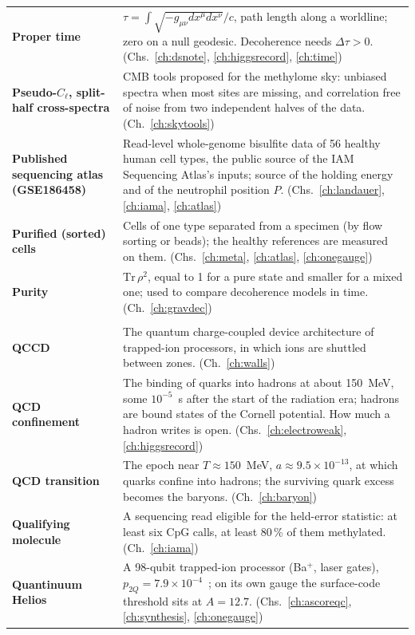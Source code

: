 {\begin{longtable}{@{}>{\raggedright\arraybackslash}p{}>{\raggedright\arraybackslash}p{}@{}}
\textbf{Proper time} & $\tau=\int\sqrt{-g_{\mu\nu}dx^\mu dx^\nu}/c$, path length along a worldline; zero on a null geodesic. Decoherence needs $\Delta\tau>0$. {\footnotesize(Chs.~\ref{ch:dsnote}, \ref{ch:higgsrecord}, \ref{ch:time})}\\[1pt]
\textbf{Pseudo-$C_\ell$, split-half cross-spectra} & CMB tools proposed for the methylome sky: unbiased spectra when most sites are missing, and correlation free of noise from two independent halves of the data. {\footnotesize(Ch.~\ref{ch:skytools})}\\[1pt]
\textbf{Published sequencing atlas (GSE186458)} & Read-level whole-genome bisulfite data of 56 healthy human cell types, the public source of the IAM Sequencing Atlas's inputs; source of the holding energy and of the neutrophil position $P$. {\footnotesize(Chs.~\ref{ch:landauer}, \ref{ch:iama}, \ref{ch:atlas})}\\[1pt]
\textbf{Purified (sorted) cells} & Cells of one type separated from a specimen (by flow sorting or beads); the healthy references are measured on them. {\footnotesize(Chs.~\ref{ch:meta}, \ref{ch:atlas}, \ref{ch:onegauge})}\\[1pt]
\textbf{Purity} & $\mathrm{Tr}\,\rho^2$, equal to 1 for a pure state and smaller for a mixed one; used to compare decoherence models in time. {\footnotesize(Ch.~\ref{ch:gravdec})}\\[1pt]
\multicolumn{2}{@{}l}{\normalsize\textbf{Q}}\\[2pt]
\textbf{QCCD} & The quantum charge-coupled device architecture of trapped-ion processors, in which ions are shuttled between zones. {\footnotesize(Ch.~\ref{ch:walls})}\\[1pt]
\textbf{QCD confinement} & The binding of quarks into hadrons at about 150~MeV, some $10^{-5}$~s after the start of the radiation era; hadrons are bound states of the Cornell potential. How much a hadron writes is open. {\footnotesize(Chs.~\ref{ch:electroweak}, \ref{ch:higgsrecord})}\\[1pt]
\textbf{QCD transition} & The epoch near $T\approx150$~MeV, $a\approx9.5\times10^{-13}$, at which quarks confine into hadrons; the surviving quark excess becomes the baryons. {\footnotesize(Ch.~\ref{ch:baryon})}\\[1pt]
\textbf{Qualifying molecule} & A sequencing read eligible for the held-error statistic: at least six CpG calls, at least 80\,\% of them methylated. {\footnotesize(Ch.~\ref{ch:iama})}\\[1pt]
\textbf{Quantinuum Helios} & A 98-qubit trapped-ion processor (Ba$^+$, laser gates), $p_{2Q}=7.9\times10^{-4}$~\cite{Ransford2025}; on its own gauge the surface-code threshold sits at $A=12.7$. {\footnotesize(Chs.~\ref{ch:ascoreqc}, \ref{ch:synthesis}, \ref{ch:onegauge})}\\[1pt]

\end{longtable}}

